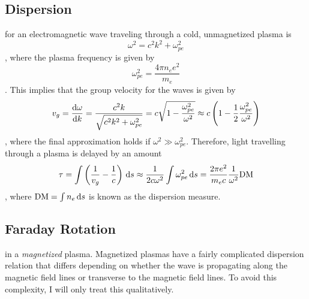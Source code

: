 \subsection{Dispersion}
 for an electromagnetic wave traveling through a cold,
unmagnetized plasma is
\begin{dmath}
    \omega^2 = c^2k^2 + \omega_{pe}^2
\end{dmath},
where the plasma frequency is given by
\begin{dmath}
    \omega_{pe}^2 = \frac{4\pi n_e e^2}{m_e}
\end{dmath}.
This implies that the group velocity for the waves is given by
\begin{dmath}
    v_g = \frac{\d\omega}{\d k} \nolinebreak
        = \frac{c^2k}{\sqrt{c^2k^2+\omega_{pe}^2}} \nolinebreak
        = c\sqrt{1-\frac{\omega_{pe}^2}{\omega^2}} \nolinebreak
        \approx c\left(1-\frac{1}{2}\frac{\omega_{pe}^2}{\omega^2}\right)
\end{dmath},
where the final approximation holds if $\omega^2 \gg \omega_{pe}^2$.
Therefore, light travelling through a plasma is delayed by an amount 
\begin{dmath}
    \tau = \int\left(\frac{1}{v_g}-\frac{1}{c}\right)\,\d s \nolinebreak
         \approx \frac{1}{2c\omega^2}\int\omega_{pe}^2\,\d s \nolinebreak
         = \frac{2\pi e^2}{m_e c} \frac{1}{\omega^2} {\rm DM}
\end{dmath},
where ${\rm DM} = \int n_e\,{\rm d} s$ is known as the dispersion measure.

\subsection{Faraday Rotation}
 in a \emph{magnetized} plasma.  Magnetized plasmas have
a fairly complicated dispersion relation that differs depending on whether the wave is
propagating along the magnetic field lines or transverse to the magnetic field lines.  To avoid
this complexity, I will only treat this qualitatively.

